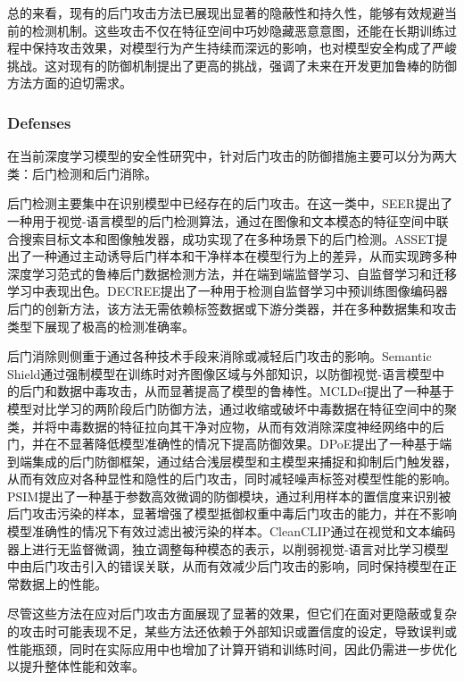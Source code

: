 \documentclass[lettersize,journal]{IEEEtran}
\begin{document}
总的来看，现有的后门攻击方法已展现出显著的隐蔽性和持久性，能够有效规避当前的检测机制。这些攻击不仅在特征空间中巧妙隐藏恶意意图，还能在长期训练过程中保持攻击效果，对模型行为产生持续而深远的影响，也对模型安全构成了严峻挑战。这对现有的防御机制提出了更高的挑战，强调了未来在开发更加鲁棒的防御方法方面的迫切需求。

\subsubsection{Defenses}
在当前深度学习模型的安全性研究中，针对后门攻击的防御措施主要可以分为两大类：后门检测和后门消除。%


后门检测主要集中在识别模型中已经存在的后门攻击。在这一类中，SEER\cite{zhu2024seer}提出了一种用于视觉-语言模型的后门检测算法，通过在图像和文本模态的特征空间中联合搜索目标文本和图像触发器，成功实现了在多种场景下的后门检测。ASSET\cite{pan2023asset}提出了一种通过主动诱导后门样本和干净样本在模型行为上的差异，从而实现跨多种深度学习范式的鲁棒后门数据检测方法，并在端到端监督学习、自监督学习和迁移学习中表现出色。DECREE\cite{feng2023detecting}提出了一种用于检测自监督学习中预训练图像编码器后门的创新方法，该方法无需依赖标签数据或下游分类器，并在多种数据集和攻击类型下展现了极高的检测准确率。


后门消除则侧重于通过各种技术手段来消除或减轻后门攻击的影响。Semantic Shield\cite{ishmam2024semantic}通过强制模型在训练时对齐图像区域与外部知识，以防御视觉-语言模型中的后门和数据中毒攻击，从而显著提高了模型的鲁棒性。MCLDef\cite{yue2023model}提出了一种基于模型对比学习的两阶段后门防御方法，通过收缩或破坏中毒数据在特征空间中的聚类，并将中毒数据的特征拉向其干净对应物，从而有效消除深度神经网络中的后门，并在不显著降低模型准确性的情况下提高防御效果。DPoE\cite{liu2023shortcuts}提出了一种基于端到端集成的后门防御框架，通过结合浅层模型和主模型来捕捉和抑制后门触发器，从而有效应对各种显性和隐性的后门攻击，同时减轻噪声标签对模型性能的影响。PSIM\cite{zhao2024defending}提出了一种基于参数高效微调的防御模块，通过利用样本的置信度来识别被后门攻击污染的样本，显著增强了模型抵御权重中毒后门攻击的能力，并在不影响模型准确性的情况下有效过滤出被污染的样本。CleanCLIP\cite{bansal2023cleanclip}通过在视觉和文本编码器上进行无监督微调，独立调整每种模态的表示，以削弱视觉-语言对比学习模型中由后门攻击引入的错误关联，从而有效减少后门攻击的影响，同时保持模型在正常数据上的性能。

尽管这些方法在应对后门攻击方面展现了显著的效果，但它们在面对更隐蔽或复杂的攻击时可能表现不足，某些方法还依赖于外部知识或置信度的设定，导致误判或性能瓶颈，同时在实际应用中也增加了计算开销和训练时间，因此仍需进一步优化以提升整体性能和效率。
\end{document}
